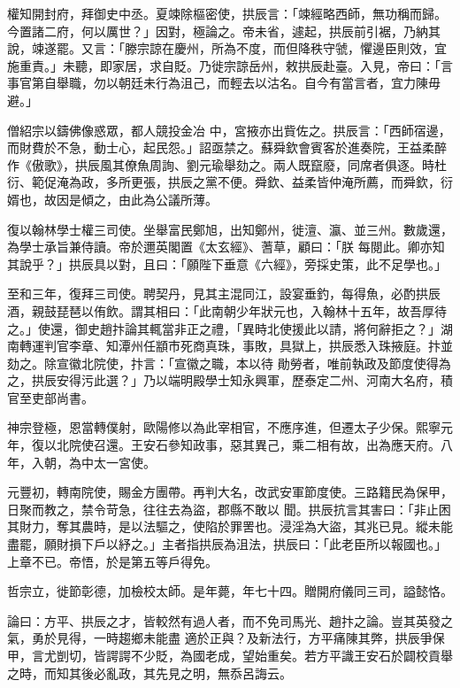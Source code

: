 \begin{pinyinscope}
 權知開封府，拜御史中丞。夏竦除樞密使，拱辰言：「竦經略西師，無功稱而歸。今置諸二府，何以厲世？」因對，極論之。帝未省，遽起，拱辰前引裾，乃納其說，竦遂罷。又言：「滕宗諒在慶州，所為不度，而但降秩守虢，懼邊臣則效，宜施重責。」未聽，即家居，求自貶。乃徙宗諒岳州，敕拱辰赴臺。入見，帝曰：「言事官第自舉職，勿以朝廷未行為沮己，而輕去以沽名。自今有當言者，宜力陳毋避。」



 僧紹宗以鑄佛像惑眾，都人競投金冶
 中，宮掖亦出貲佐之。拱辰言：「西師宿邊，而財費於不急，動士心，起民怨。」詔亟禁之。蘇舜欽會賓客於進奏院，王益柔醉作《傲歌》，拱辰風其僚魚周詢、劉元瑜舉劾之。兩人既竄廢，同席者俱逐。時杜衍、範促淹為政，多所更張，拱辰之黨不便。舜欽、益柔皆仲淹所薦，而舜欽，衍婿也，故因是傾之，由此為公議所薄。



 復以翰林學士權三司使。坐舉富民鄭旭，出知鄭州，徙澶、瀛、並三州。數歲還，為學士承旨兼侍讀。帝於邇英閣置《太玄經》、蓍草，顧曰：「朕
 每閱此。卿亦知其說乎？」拱辰具以對，且曰：「願陛下垂意《六經》，旁採史策，此不足學也。」



 至和三年，復拜三司使。聘契丹，見其主混同江，設宴垂釣，每得魚，必酌拱辰酒，親鼓琵琶以侑飲。謂其相曰：「此南朝少年狀元也，入翰林十五年，故吾厚待之。」使還，御史趙抃論其輒當非正之禮，「異時北使援此以請，將何辭拒之？」湖南轉運判官李章、知潭州任顓市死商真珠，事敗，具獄上，拱辰悉入珠掖庭。抃並劾之。除宣徽北院使，抃言：「宣徽之職，本以待
 勛勞者，唯前執政及節度使得為之，拱辰安得污此選？」乃以端明殿學士知永興軍，歷泰定二州、河南大名府，積官至吏部尚書。



 神宗登極，恩當轉僕射，歐陽修以為此宰相官，不應序進，但遷太子少保。熙寧元年，復以北院使召還。王安石參知政事，惡其異己，乘二相有故，出為應天府。八年，入朝，為中太一宮使。



 元豐初，轉南院使，賜金方團帶。再判大名，改武安軍節度使。三路籍民為保甲，日聚而教之，禁令苛急，往往去為盜，郡縣不敢以
 聞。拱辰抗言其害曰：「非止困其財力，奪其農時，是以法驅之，使陷於罪罟也。浸淫為大盜，其兆已見。縱未能盡罷，願財損下戶以紓之。」主者指拱辰為沮法，拱辰曰：「此老臣所以報國也。」上章不已。帝悟，於是第五等戶得免。



 哲宗立，徙節彰德，加檢校太師。是年薨，年七十四。贈開府儀同三司，謚懿恪。



 論曰：方平、拱辰之才，皆較然有過人者，而不免司馬光、趙抃之論。豈其英發之氣，勇於見得，一時趨鄉未能盡
 適於正與？及新法行，方平痛陳其弊，拱辰爭保甲，言尤剴切，皆諤諤不少貶，為國老成，望始重矣。若方平識王安石於闢校貢舉之時，而知其後必亂政，其先見之明，無忝呂誨云。




\end{pinyinscope}
